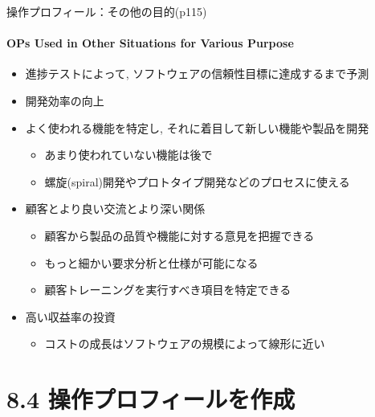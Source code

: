 \begin{frame}{操作プロフィール：その他の目的(p115)}
\framesubtitle{OPs Used in Other Situations for Various Purpose}
\begin{itemize}
\item<+-> 進捗テストによって, ソフトウェアの信頼性目標に達成するまで予測
\item<+-> 開発効率の向上
\item<+-> よく使われる機能を特定し, それに着目して新しい機能や製品を開発
    \begin{itemize}
    \item あまり使われていない機能は後で
    \item 螺旋(spiral)開発やプロトタイプ開発などのプロセスに使える
    \end{itemize}
\item<+-> 顧客とより良い交流とより深い関係
    \begin{itemize}
    \item 顧客から製品の品質や機能に対する意見を把握できる
    \item もっと細かい要求分析と仕様が可能になる
    \item 顧客トレーニングを実行すべき項目を特定できる
    \end{itemize}
\item<+-> 高い収益率の投資
    \begin{itemize}
    \item コストの成長はソフトウェアの規模によって線形に近い
    \end{itemize}
\end{itemize}
\end{frame}
\section{8.4 操作プロフィールを作成}
